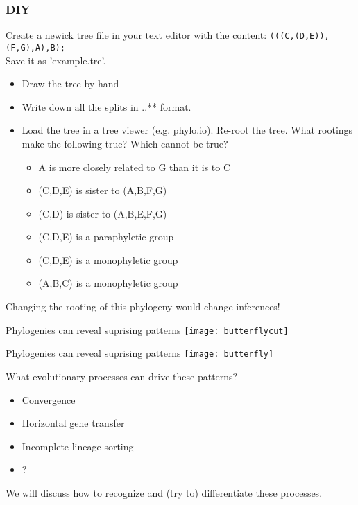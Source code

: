 \documentclass{beamer}
\begin{document}
\begin{frame}
\frametitle{DIY}
Create a newick tree file in your text editor with the content:
\texttt{(((C,(D,E)),(F,G),A),B);}\\
Save it as 'example.tre'.\\
\begin{itemize}
 \item Draw the tree by hand
 \item Write down all the splits in ..** format.
 \item Load the tree in a tree viewer (e.g. phylo.io). Re-root  the tree. What rootings make the following true? Which cannot be true?
 \begin{itemize}
 \item A is more closely related to G than it is to C
 \item (C,D,E) is sister to (A,B,F,G)
 \item (C,D) is sister to (A,B,E,F,G)
 \item (C,D,E) is a paraphyletic group
 \item (C,D,E) is a monophyletic group
 \item (A,B,C) is a monophyletic group
 \end{itemize}
\end{itemize}
\end{frame}





\begin{frame}
Changing the rooting of this phylogeny would change inferences!
\end{frame}


\begin{frame}
Phylogenies can reveal suprising patterns
 \texttt{[image: butterflycut]}
\end{frame}

\begin{frame}
Phylogenies can reveal suprising patterns
 \texttt{[image: butterfly]}
 \citep{joron_chromosomal_2011}
\end{frame}



\begin{frame}
What evolutionary processes can drive these patterns?
\begin{itemize}
 \item Convergence
 \item Horizontal gene transfer
 \item Incomplete lineage sorting
 \item ?
\end{itemize}
\pause
We will discuss how to recognize and (try to) differentiate these processes.
\end{frame}
\end{document}
